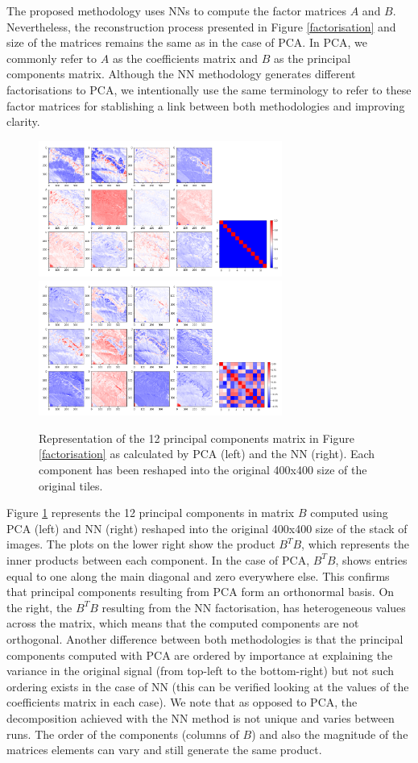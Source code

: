 \documentclass[essd, manuscript]{copernicus}
\begin{document}
The proposed methodology uses NNs to compute the factor matrices $A$ and $B$. Nevertheless, the reconstruction process presented in Figure \ref{factorisation} and size of the matrices remains the same as in the case of PCA. In PCA, we commonly refer to $A$ as the coefficients matrix and $B$ as the principal components matrix. Although the NN methodology generates different factorisations to PCA, we intentionally use the same terminology to refer to these factor matrices for stablishing a link between both methodologies and improving clarity.

\begin{figure}%
    {{\includegraphics[width=8cm]{fig4a.png} }}%
    {{\includegraphics[width=8cm]{fig4b.png} }}%
	\caption{Representation of the 12 principal components matrix in Figure \ref{factorisation} as calculated by PCA (left) and the NN (right). Each component has been reshaped into the original 400x400 size of the original tiles.}%
    \label{pcs}%
\end{figure}

Figure \ref{pcs} represents the 12 principal components in matrix $B$ computed using PCA (left) and NN (right) reshaped into the original 400x400 size of the stack of images. The plots on the lower right show the product $B^TB$, which represents the inner products between each component. In the case of PCA, $B^TB$, shows entries equal to one along the main diagonal and zero everywhere else. This confirms that principal components resulting from PCA form an orthonormal basis. On the right, the $B^TB$ resulting from the NN factorisation, has heterogeneous values across the matrix, which means that the computed components are not orthogonal. Another difference between both methodologies is that the principal components computed with PCA are ordered by importance at explaining the variance in the original signal (from top-left to the bottom-right) but not such ordering exists in the case of NN (this can be verified looking at the values of the coefficients matrix in each case). We note that as opposed to PCA, the decomposition achieved with the NN method is not unique and varies between runs. The order of the components (columns of $B$) and also the magnitude of the matrices elements can vary and still generate the same product.
\end{document}
